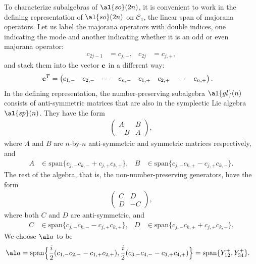 To characterize subalgebras of $\al{so}(2n)$, it is convenient to work in the defining representation of $\al{so}(2n)$ on $\mathcal{C}_1$, the linear span of majorana operators. Let us label the majorana operators with double indices, one indicating the mode and another indicating whether it is an odd or even majorana operator:
\begin{align}
	c_{2j-1} &= c_{j,-}, &
    c_{2j} &= c_{j,+},
\end{align}
and stack them into the vector ${\bf c}$ in a different way:
\begin{align}
{\bf c}^T &= \begin{pmatrix} c_{1,-} & c_{2,-} & \cdots & c_{n,-} & c_{1,+} & c_{2,+} & \cdots & c_{n,+}
\end{pmatrix}.
\end{align}
In the defining representation, the number-preserving subalgebra $\al{gl}(n)$ consists of anti-symmetric matrices that are also in the symplectic Lie algebra $\al{sp}(n)$. They have the form
\begin{align}\label{ortho-symplectic}
	\begin{pmatrix}
	A & B \\
    -B & A
	\end{pmatrix},
\end{align}
where $A$ and $B$ are $n$-by-$n$ anti-symmetric and symmetric matrices respectively, and
\begin{align}
	A &\in \text{span}\{ c_{j,-} c_{k,-} + c_{j,+} c_{k,+} \}, &
	B &\in \text{span}\{ c_{j,-} c_{k,+} - c_{j,+} c_{k,-} \}.
\end{align}
The rest of the algebra, that is, the non-number-preserving generators, have the form
\begin{align}
	\begin{pmatrix}
	C & D \\
    D & -C
	\end{pmatrix},
\end{align}
where both $C$ and $D$ are anti-symmetric, and
\begin{align}
	C &\in \text{span}\{ c_{j,-} c_{k,-} - c_{j,+} c_{k,+} \}, &
	D &\in \text{span}\{ c_{j,-} c_{k,+} + c_{j,+} c_{k,-} \}.
\end{align}
We choose $\al a$ to be
\begin{align}
	\al a &= \text{span} \Bigl\{ \frac{i}{2} (c_{1,-} c_{2,-} - c_{1,+} c_{2,+}), \frac{i}{2}(c_{3,-} c_{4,-} - c_{3,+} c_{4,+}) \Bigr\} = \text{span} \{ Y^+_{12}, Y^+_{34} \}.
\end{align}
